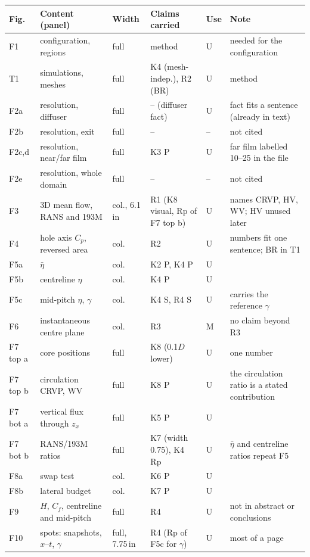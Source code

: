 \documentclass[10pt]{article}
\begin{document}
{\footnotesize
\begin{longtable}{@{}L{1.0cm} L{3.9cm} L{0.9cm} L{3.4cm} L{0.7cm} L{6.3cm}@{}}
\toprule
Fig. & Content (panel) & Width & Claims carried & Use & Note \\
\midrule
\endhead
F1 & configuration, regions & full & method & U & needed for the configuration \\
T1 & simulations, meshes & full & K4 (mesh-indep.), R2 (BR) & U & method \\
F2a & resolution, diffuser & full & -- (diffuser fact) & U & fact fits a sentence (already in text) \\
F2b & resolution, exit & full & -- & -- & not cited \\
F2c,d & resolution, near/far film & full & K3 P & U & far film labelled 10--25 in the file \\
F2e & resolution, whole domain & full & -- & -- & not cited \\
F3 & 3D mean flow, RANS and 193M & col., 6.1\,in & R1 (K8 visual, Rp of F7 top b) & U & names CRVP, HV, WV; HV unused later \\
F4 & hole axis $C_p$, reversed area & col. & R2 & U & numbers fit one sentence; BR in T1 \\
F5a & $\bar\eta$ & col. & K2 P, K4 P & U & \\
F5b & centreline $\eta$ & col. & K4 P & U & \\
F5c & mid-pitch $\eta$, $\gamma$ & col. & K4 S, R4 S & U & carries the reference $\gamma$ \\
F6 & instantaneous centre plane & col. & R3 & M & no claim beyond R3 \\
F7 top a & core positions & full & K8 (0.1$D$ lower) & U & one number \\
F7 top b & circulation CRVP, WV & full & K8 P & U & the circulation ratio is a stated contribution \\
F7 bot a & vertical flux through $z_x$ & full & K5 P & U & \\
F7 bot b & RANS/193M ratios & full & K7 (width 0.75), K4 Rp & U & $\bar\eta$ and centreline ratios repeat F5 \\
F8a & swap test & col. & K6 P & U & \\
F8b & lateral budget & col. & K7 P & U & \\
F9 & $H$, $C_f$, centreline and mid-pitch & full & R4 & U & not in abstract or conclusions \\
F10 & spots: snapshots, $x$--$t$, $\gamma$ & full, 7.75\,in & R4 (Rp of F5c for $\gamma$) & U & most of a page \\

\end{longtable}}
\end{document}
